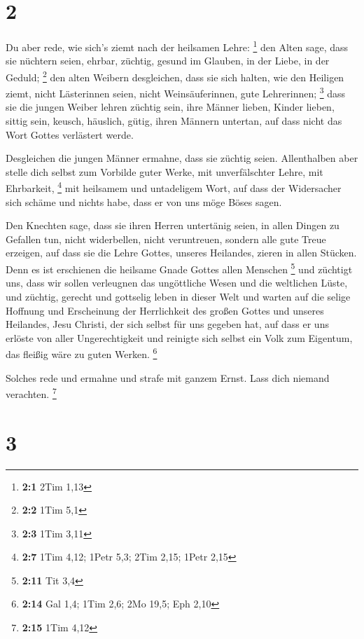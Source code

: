 \hypertarget{section-1}{%
\section{2}\label{section-1}}

 Du aber rede, wie sich's ziemt nach der heilsamen Lehre:
\footnote{\textbf{2:1} 2Tim 1,13}  den Alten sage, dass sie
nüchtern seien, ehrbar, züchtig, gesund im Glauben, in der Liebe, in der
Geduld; \footnote{\textbf{2:2} 1Tim 5,1}  den alten Weibern
desgleichen, dass sie sich halten, wie den Heiligen ziemt, nicht
Lästerinnen seien, nicht Weinsäuferinnen, gute Lehrerinnen; \footnote{\textbf{2:3}
  1Tim 3,11}  dass sie die jungen Weiber lehren züchtig
sein, ihre Männer lieben, Kinder lieben,  sittig sein,
keusch, häuslich, gütig, ihren Männern untertan, auf dass nicht das Wort
Gottes verlästert werde.

 Desgleichen die jungen Männer ermahne, dass sie züchtig
seien.  Allenthalben aber stelle dich selbst zum Vorbilde
guter Werke, mit unverfälschter Lehre, mit Ehrbarkeit, \footnote{\textbf{2:7}
  1Tim 4,12; 1Petr 5,3; 2Tim 2,15; 1Petr 2,15}  mit
heilsamem und untadeligem Wort, auf dass der Widersacher sich schäme und
nichts habe, dass er von uns möge Böses sagen.

 Den Knechten sage, dass sie ihren Herren untertänig seien,
in allen Dingen zu Gefallen tun, nicht widerbellen,  nicht
veruntreuen, sondern alle gute Treue erzeigen, auf dass sie die Lehre
Gottes, unseres Heilandes, zieren in allen Stücken.  Denn
es ist erschienen die heilsame Gnade Gottes allen Menschen \footnote{\textbf{2:11}
  Tit 3,4}  und züchtigt uns, dass wir sollen verleugnen
das ungöttliche Wesen und die weltlichen Lüste, und züchtig, gerecht und
gottselig leben in dieser Welt  und warten auf die selige
Hoffnung und Erscheinung der Herrlichkeit des großen Gottes und unseres
Heilandes, Jesu Christi,  der sich selbst für uns gegeben
hat, auf dass er uns erlöste von aller Ungerechtigkeit und reinigte sich
selbst ein Volk zum Eigentum, das fleißig wäre zu guten Werken.
\footnote{\textbf{2:14} Gal 1,4; 1Tim 2,6; 2Mo 19,5; Eph 2,10}

 Solches rede und ermahne und strafe mit ganzem Ernst. Lass
dich niemand verachten. \footnote{\textbf{2:15} 1Tim 4,12}

\hypertarget{section-2}{%
\section{3}\label{section-2}}

